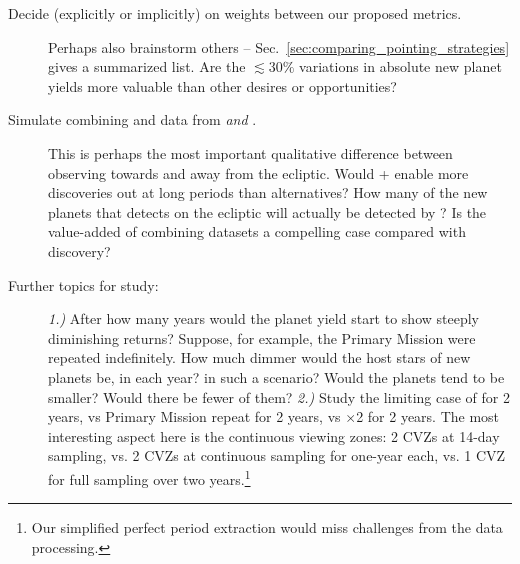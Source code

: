 \begin{description}
	\item[Decide (explicitly or implicitly) on weights between our
          proposed metrics.]  Perhaps also brainstorm others --
          Sec.~\ref{sec:comparing_pointing_strategies} gives a
          summarized list.  Are the $\lesssim30\%$ variations in
          absolute new planet yields more valuable than other desires
          or opportunities?
	
	\item[Simulate combining \tess and \ktwo data from
          \rm{\elong\:} \textit{and} \rm{\eshort}.]  This is perhaps
          the most important qualitative difference between observing
          towards and away from the ecliptic.  Would \tess\!+\ktwo
          enable more discoveries out at long periods than
          alternatives?  How many of the new planets that \tess
          detects on the ecliptic will actually be detected by \ktwo?
          Is the value-added of combining datasets a compelling case
          compared with discovery?
	
	\item[Further topics for study:]
	\textit{1.)}
	After how many years would the planet yield start to show steeply diminishing returns?
	Suppose, for example, the Primary Mission were repeated indefinitely.
        How much dimmer would the host stars of new planets be, in each year? in such a scenario?
	Would the planets tend to be smaller?
	Would there be fewer of them?
	\textit{2.)}
	Study the limiting case of \hemis\:for 2 years, vs Primary Mission repeat for 2 years, vs \npole$\times$2 for 2 years. The most interesting aspect here is the continuous viewing zones: 2 CVZs at 14-day sampling, vs. 2 CVZs at continuous sampling for one-year each, vs. 1 CVZ for full sampling over two years.\footnote{Our simplified perfect period extraction would miss challenges from the data processing.}
\end{description}
